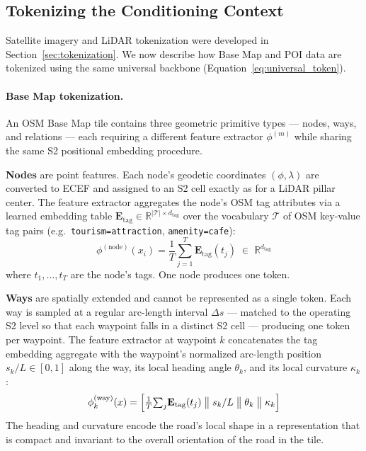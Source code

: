\documentclass{book}
\begin{document}
\subsection{Tokenizing the Conditioning Context}
\label{sec:conditioned-context}
Satellite imagery and LiDAR tokenization were developed in
Section~\ref{sec:tokenization}.  We now describe how Base Map and
POI data are tokenized using the same universal backbone
(Equation~\ref{eq:universal_token}).

\paragraph{Base Map tokenization.}

An OSM Base Map tile contains three geometric primitive types ---
nodes, ways, and relations --- each requiring a different feature
extractor $\phi^{(m)}$ while sharing the same S2 positional
embedding procedure.

\textbf{Nodes} are point features.  Each node's geodetic
coordinates $(\phi, \lambda)$ are converted to ECEF and assigned
to an S2 cell exactly as for a LiDAR pillar center.  The feature
extractor aggregates the node's OSM tag attributes via a learned
embedding table $\mathbf{E}_{\text{tag}} \in \mathbb{R}^{|\mathcal{T}|
\times d_{\text{tag}}}$ over the vocabulary $\mathcal{T}$ of OSM
key-value tag pairs (e.g.\ \texttt{tourism=attraction},
\texttt{amenity=cafe}):
\begin{equation}
  \phi^{(\text{node})}(x_i) =
    \frac{1}{T}\sum_{j=1}^{T} \mathbf{E}_{\text{tag}}(t_j)
    \;\in\; \mathbb{R}^{d_{\text{tag}}}
  \label{eq:node_feature}
\end{equation}
where $t_1, \ldots, t_T$ are the node's tags.  One node produces
one token.

\textbf{Ways} are spatially extended and cannot be represented as
a single token.  Each way is sampled at a regular arc-length
interval $\Delta s$ --- matched to the operating S2 level so that
each waypoint falls in a distinct S2 cell --- producing one token
per waypoint.  The feature extractor at waypoint $k$ concatenates
the tag embedding aggregate with the waypoint's normalized
arc-length position $s_k/L \in [0,1]$ along the way, its local
heading angle $\theta_k$, and its local curvature $\kappa_k$:
\begin{equation}
  \phi^{(\text{way})}_k(x) =
    \Bigl[
      \tfrac{1}{T}{\textstyle\sum_j} \mathbf{E}_{\text{tag}}(t_j)
      \;\big\|\;
      s_k/L
      \;\big\|\;
      \theta_k
      \;\big\|\;
      \kappa_k
    \Bigr]
  \label{eq:way_feature}
\end{equation}
The heading and curvature encode the road's local shape in a
representation that is compact and invariant to the overall
orientation of the road in the tile.
\end{document}
